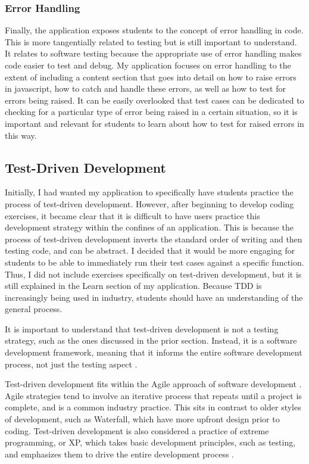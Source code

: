 \documentclass[10pt,twocolumn]{article}
\begin{document}
\subsubsection{Error Handling}

Finally, the application exposes students to the concept of error handling in code. This is more tangentially related to 
testing but is still important to understand. It relates to software testing because the appropriate use of error handling 
makes code easier to test and debug. My application focuses on error handling to the extent of including a content section
that goes into detail on how to raise errors in javascript, how to catch and handle these errors, as well as how to test
for errors being raised. It can be easily overlooked that test cases can be dedicated to checking for a particular type 
of error being raised in a certain situation, so it is important and relevant for students to learn about how to test 
for raised errors in this way. 

\subsection{Test-Driven Development}

Initially, I had wanted my application to specifically have students practice the process of test-driven development. 
However, after beginning to develop coding exercises, it became clear that it is difficult to have users practice this 
development strategy within the confines of an application. This is because the process of test-driven development inverts
the standard order of writing and then testing code, and can be abstract. I decided that it would be more engaging for students to be able to 
immediately run their test cases against a specific function. Thus, I did not include exercises specifically on test-driven
development, but it is still explained in the Learn section of my application. Because TDD is increasingly being used in 
industry, students should have an understanding of the general process. 

It is important to understand that test-driven development is not a testing strategy, such as 
the ones discussed in the prior section. Instead, it is a software development framework, meaning
that it informs the entire software development process, not just the testing aspect \cite{George2004Article}.

Test-driven development fits within the Agile approach of software development \cite{Janzen2005Article}. Agile 
strategies tend to involve an iterative process that repeats until a project is complete, and is a common industry 
practice. This sits in contrast to older styles of development, such as Waterfall, which have more upfront design 
prior to coding. Test-driven development is also considered a practice of extreme 
programming, or XP, which takes basic development principles, such as testing, and emphasizes them to drive the entire 
development process \cite{Desai2008Article}.
\end{document}
